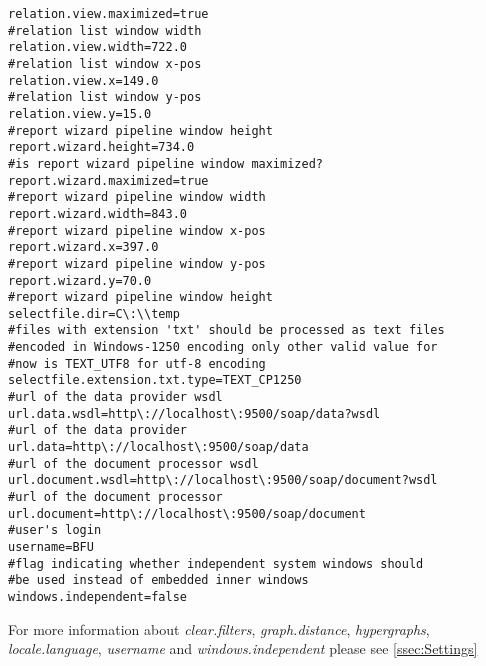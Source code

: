 \documentclass[12pt,a4paper]{report}
\begin{document}
\begin{lstlisting}[frame=single,language=properties]
relation.view.maximized=true
#relation list window width
relation.view.width=722.0
#relation list window x-pos
relation.view.x=149.0
#relation list window y-pos
relation.view.y=15.0
#report wizard pipeline window height
report.wizard.height=734.0
#is report wizard pipeline window maximized?
report.wizard.maximized=true
#report wizard pipeline window width
report.wizard.width=843.0
#report wizard pipeline window x-pos
report.wizard.x=397.0
#report wizard pipeline window y-pos
report.wizard.y=70.0
#report wizard pipeline window height
selectfile.dir=C\:\\temp
#files with extension 'txt' should be processed as text files
#encoded in Windows-1250 encoding only other valid value for
#now is TEXT_UTF8 for utf-8 encoding
selectfile.extension.txt.type=TEXT_CP1250
#url of the data provider wsdl
url.data.wsdl=http\://localhost\:9500/soap/data?wsdl
#url of the data provider
url.data=http\://localhost\:9500/soap/data
#url of the document processor wsdl
url.document.wsdl=http\://localhost\:9500/soap/document?wsdl
#url of the document processor
url.document=http\://localhost\:9500/soap/document
#user's login
username=BFU
#flag indicating whether independent system windows should
#be used instead of embedded inner windows
windows.independent=false
\end{lstlisting}

For more information about \emph{clear.filters}, \emph{graph.distance},
\emph{hypergraphs}, \emph{locale.language}, \emph{username}
and \emph{windows.independent} please see \ref{ssec:Settings}
\end{document}
